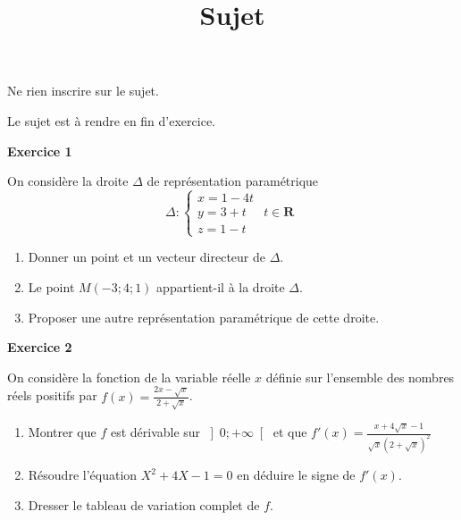 \documentclass[12pt,a4paper,french]{article}
\author{}
\title{Sujet \no{4}}
\date{}
\begin{document}
\maketitle
\begin{center}Ne rien inscrire sur le sujet.

  Le sujet est à rendre en fin d'exercice.
\end{center}

\bigskip

\textbf{Exercice 1}

On considère la droite $\Delta$ de représentation paramétrique \[ \Delta
  : \left\lbrace \begin{array}{lr} x = 1 - 4t & \\ y = 3 + t & t\in
\mathbf{R} \\ z = 1 - t & \end{array}\right. \]

\begin{enumerate}
  \item Donner un point et un vecteur directeur de $\Delta$.
  \item Le point $M (-3;4;1)$ appartient-il à la droite $\Delta$.
  \item Proposer une autre représentation paramétrique de cette droite.
\end{enumerate}

\medskip

\textbf{Exercice 2}

On considère la fonction de la variable réelle $x$ définie sur
l'ensemble des nombres réels positifs par $f(x) = \frac{2x - \sqrt{x}}{2
+ \sqrt{x}}$.

\begin{enumerate}
  \item Montrer que $f$ est dérivable sur $\left]0 ; +\infty\right[$ et
    que $f'(x) = \frac{ x + 4\sqrt{x} - 1}{\sqrt{x}(2 + \sqrt{x})^2}$
  \item Résoudre l'équation $X^2 + 4X - 1 =0$ en déduire le signe de
    $f'(x)$.
  \item Dresser le tableau de variation complet de $f$.
\end{enumerate}
\end{document}
